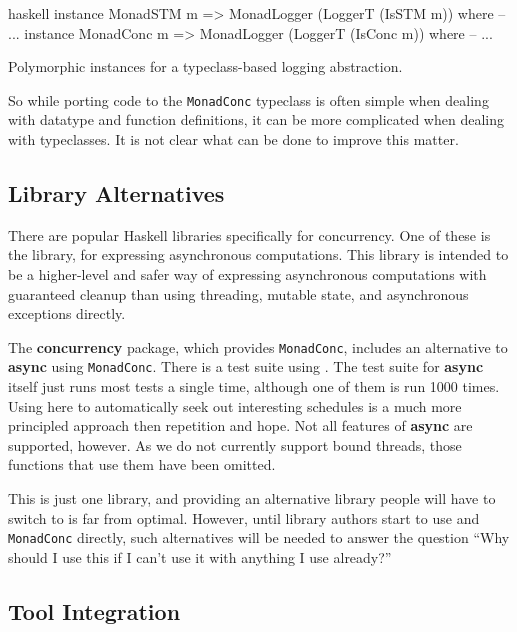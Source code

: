 \begin{listing}
\centering
\begin{cminted}{haskell}
instance MonadSTM  m => MonadLogger (LoggerT (IsSTM  m)) where -- ...
instance MonadConc m => MonadLogger (LoggerT (IsConc m)) where -- ...
\end{cminted}
\caption{Polymorphic instances for a typeclass-based logging abstraction.}\label{lst:mlogger3}
\end{listing}

So while porting code to the \verb|MonadConc| typeclass is often
simple when dealing with datatype and function definitions, it can be
more complicated when dealing with typeclasses.  It is not clear what
can be done to improve this matter.

\subsection{Library Alternatives}

There are popular Haskell libraries specifically for concurrency.  One
of these is the  library, for expressing asynchronous
computations.  This library is intended to be a higher-level and safer
way of expressing asynchronous computations with guaranteed cleanup
than using threading, mutable state, and asynchronous exceptions
directly.

The \textbf{concurrency} package, which provides \verb|MonadConc|,
includes an alternative to \textbf{async} using \verb|MonadConc|.
There is a test suite using \dejafu{}.  The test suite for
\textbf{async} itself just runs most tests a single time, although one
of them is run 1000 times.  Using \dejafu{} here to automatically seek
out interesting schedules is a much more principled approach then
repetition and hope.  Not all features of \textbf{async} are
supported, however.  As we do not currently support bound threads,
those functions that use them have been omitted.

This is just one library, and providing an alternative library people
will have to switch to is far from optimal.  However, until library
authors start to use \dejafu{} and \verb|MonadConc| directly, such
alternatives will be needed to answer the question ``Why should I use
this if I can't use it with anything I use already?''

\subsection{Tool Integration}

